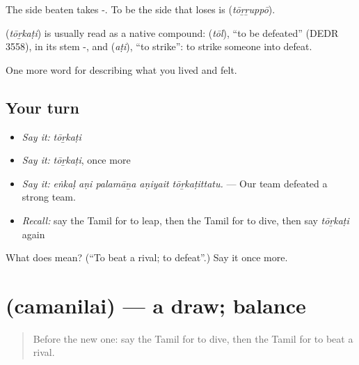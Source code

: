 The side beaten takes -. To be the side that loses is  (\emph{tōṟṟuppō}).

\begin{cousinweb}
\textbf{} (\emph{tōṟkaṭi}) is usually read as a native compound:  (\emph{tōl}), \textquotedblleft{}to be defeated\textquotedblright{} (DEDR 3558), in its stem -, and  (\emph{aṭi}), \textquotedblleft{}to strike\textquotedblright{}: to strike someone into defeat.
\end{cousinweb}

\begin{grammarlens}[title={What you've built}]
One more word for describing what you lived and felt.
\end{grammarlens}

\subsection*{Your turn}
\begin{itemize}
\raggedright
  \item \emph{Say it:} \emph{tōṟkaṭi}
  \item \emph{Say it:} \emph{tōṟkaṭi}, once more
  \item \emph{Say it:} \emph{eṅkaḷ aṇi palamāṉa aṇiyait tōṟkaṭittatu.} — Our team defeated a strong team.
  \item \emph{Recall:} say the Tamil for to leap, then the Tamil for to dive, then say \emph{tōṟkaṭi} again
\end{itemize}

\begin{tcolorbox}[breakable,colback=teal!4,colframe=teal!35!black,title={Before you move on}]
What does  mean? (\textquotedblleft{}To beat a rival; to defeat\textquotedblright{}.) Say it once more.
\end{tcolorbox}
\section[\texorpdfstring{\ta{சமநிலை} (camanilai)}{சமநிலை (camanilai)}]{ (camanilai) — a draw; balance}

\label{lesson:TA-C534-camanilai}



\begin{quote}
Before the new one: say the Tamil for to dive, then the Tamil for to beat a rival.
\end{quote}

